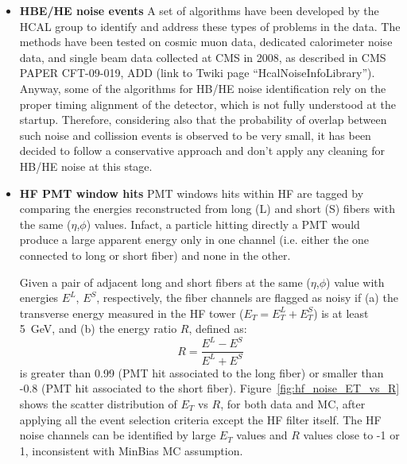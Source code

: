\begin{itemize}
%
\item{\bf HBE/HE noise events} A set of algorithms have been developed by the HCAL group to 
identify and address these types of problems in the data. The methods have been tested on cosmic muon data, 
dedicated calorimeter noise data, and single beam data collected at CMS in 2008, 
as described in CMS PAPER CFT-09-019, ADD (link to Twiki page ``HcalNoiseInfoLibrary''). 
Anyway, some of the algorithms for HB/HE noise identification rely on the proper 
timing alignment of the detector, which is not fully understood at the startup.
Therefore, considering also that the probability of overlap between such noise and 
collission events is observed to be very small, it has been decided to follow a conservative approach and 
don't apply any cleaning for HB/HE noise at this stage.
%
\item{\bf HF PMT window hits} PMT windows hits within HF are tagged by comparing 
the energies reconstructed from long (L) and short (S) fibers with the same ($\eta$,$\phi$) values. 
Infact, a particle hitting directly a PMT would produce a large apparent energy only in one channel 
(i.e. either the one connected to long or short fiber) and none in the other.

Given a pair of adjacent long and short fibers at the same ($\eta$,$\phi$) value 
with energies $E^L$, $E^S$, respectively, the fiber channels are flagged as noisy if 
(a) the transverse energy measured in the HF tower ($E_T=E_T^L+E_T^S$) is at least 5~GeV, 
and (b) the energy ratio $R$, defined as:
%
\begin{equation}
R = \frac{E^L - E^S}{E^L + E^S}
\end{equation}
%
is greater than 0.99 (PMT hit associated to the long fiber) 
or smaller than -0.8 (PMT hit associated to the short fiber). 
Figure~\ref{fig:hf_noise_ET_vs_R} shows the scatter distribution of $E_T$ vs $R$, 
for both data and MC, after applying all the event selection criteria except 
the HF filter itself. The HF noise channels can be identified by 
large $E_T$ values and $R$ values close to -1 or 1, 
inconsistent with MinBias MC assumption.


\end{itemize}

